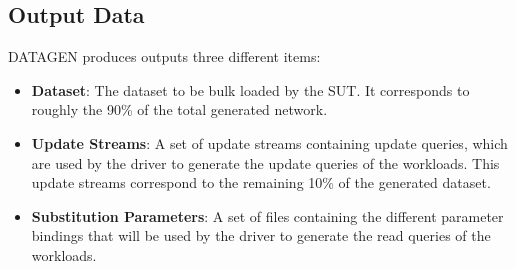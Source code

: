 %
%
%
%
%

\subsection{Output Data}

DATAGEN produces outputs three different items:
\begin{itemize}
  \item \textbf{Dataset}: The dataset to be bulk loaded by the SUT. It
    corresponds to roughly the 90\% of the total generated network.
  \item \textbf{Update Streams}: A set of update streams containing update
    queries, which are used by the driver to generate the update queries of the
    workloads. This update
    streams correspond to the remaining 10\% of the generated dataset.
  \item \textbf{Substitution Parameters}: A set of files containing the
    different parameter bindings that will be used by the driver to generate the
    read queries of the workloads. 
\end{itemize}

